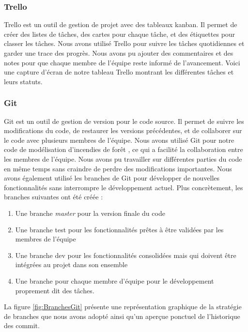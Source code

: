 \subsubsection{Trello}

Trello est un outil de gestion de projet avec des tableaux kanban. Il permet de créer des listes de tâches, des cartes pour chaque tâche, et des étiquettes pour classer les tâches. Nous avons utilisé Trello pour suivre les tâches quotidiennes et garder une trace des progrès. Nous avons pu ajouter des commentaires et des notes pour que chaque membre de l'équipe reste informé de l'avancement. Voici une capture d'écran de notre tableau Trello montrant les différentes tâches et leurs statuts.

\subsubsection{Git}

Git est un outil de gestion de version pour le code source. Il permet de suivre les modifications du code, de restaurer les versions précédentes, et de collaborer sur le code avec plusieurs membres de l'équipe. Nous avons utilisé Git pour notre code de modélisation d'incendies de forêt \parencite{gitrepo}, ce qui a facilité la collaboration entre les membres de l'équipe. Nous avons pu travailler sur différentes parties du code en même temps sans craindre de perdre des modifications importantes. Nous avons également utilisé les branches de Git pour développer de nouvelles fonctionnalités sans interrompre le développement actuel. Plus concrètement, les branches suivantes ont été créée :

\begin{enumerate}
    \item Une branche \textit{master} pour la version finale du code
    \item Une branche test pour les fonctionnalités prêtes à être validées par les membres de l’équipe
    \item Une branche dev pour les fonctionnalités consolidées mais qui doivent être intégrées au projet dans son ensemble
    \item Une branche pour chaque membre d’équipe pour le développement proprement dit des tâches.
\end{enumerate}

La figure \ref{fig:BranchesGit} présente une représentation graphique de la stratégie de branches que nous avons adopté ainsi qu'un aperçue ponctuel de l’historique des commit.

